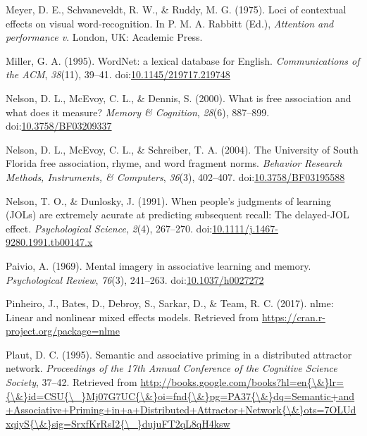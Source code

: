 \documentclass[english,,man]{apa6}
\begin{document}
\hypertarget{ref-Meyer1975}{}
Meyer, D. E., Schvaneveldt, R. W., \& Ruddy, M. G. (1975). Loci of
contextual effects on visual word-recognition. In P. M. A. Rabbitt
(Ed.), \emph{Attention and performance v}. London, UK: Academic Press.

\hypertarget{ref-Miller1995}{}
Miller, G. A. (1995). WordNet: a lexical database for English.
\emph{Communications of the ACM}, \emph{38}(11), 39--41.
doi:\href{https://doi.org/10.1145/219717.219748}{10.1145/219717.219748}

\hypertarget{ref-Nelson2000}{}
Nelson, D. L., McEvoy, C. L., \& Dennis, S. (2000). What is free
association and what does it measure? \emph{Memory \& Cognition},
\emph{28}(6), 887--899.
doi:\href{https://doi.org/10.3758/BF03209337}{10.3758/BF03209337}

\hypertarget{ref-Nelson2004}{}
Nelson, D. L., McEvoy, C. L., \& Schreiber, T. A. (2004). The University
of South Florida free association, rhyme, and word fragment norms.
\emph{Behavior Research Methods, Instruments, \& Computers},
\emph{36}(3), 402--407.
doi:\href{https://doi.org/10.3758/BF03195588}{10.3758/BF03195588}

\hypertarget{ref-Nelson1991}{}
Nelson, T. O., \& Dunlosky, J. (1991). When people's judgments of
learning (JOLs) are extremely acurate at predicting subsequent recall:
The delayed-JOL effect. \emph{Psychological Science}, \emph{2}(4),
267--270.
doi:\href{https://doi.org/10.1111/j.1467-9280.1991.tb00147.x}{10.1111/j.1467-9280.1991.tb00147.x}

\hypertarget{ref-Paivio1969}{}
Paivio, A. (1969). Mental imagery in associative learning and memory.
\emph{Psychological Review}, \emph{76}(3), 241--263.
doi:\href{https://doi.org/10.1037/h0027272}{10.1037/h0027272}

\hypertarget{ref-Pinheiro2017}{}
Pinheiro, J., Bates, D., Debroy, S., Sarkar, D., \& Team, R. C. (2017).
nlme: Linear and nonlinear mixed effects models. Retrieved from
\url{https://cran.r-project.org/package=nlme}

\hypertarget{ref-Plaut1995}{}
Plaut, D. C. (1995). Semantic and associative priming in a distributed
attractor network. \emph{Proceedings of the 17th Annual Conference of
the Cognitive Science Society}, 37--42. Retrieved from
\href{http://books.google.com/books?hl=en\%7B/\&\%7Dlr=\%7B/\&\%7Did=CSU\%7B/_\%7DMj07G7UC\%7B/\&\%7Doi=fnd\%7B/\&\%7Dpg=PA37\%7B/\&\%7Ddq=Semantic+and+Associative+Priming+in+a+Distributed+Attractor+Network\%7B/\&\%7Dots=7OLUdxqiyS\%7B/\&\%7Dsig=SrxfKrRsI2\%7B/_\%7DdujuFT2qL8qH4ksw}{http://books.google.com/books?hl=en\{\textbackslash{}\&\}lr=\{\textbackslash{}\&\}id=CSU\{\textbackslash{}\_\}Mj07G7UC\{\textbackslash{}\&\}oi=fnd\{\textbackslash{}\&\}pg=PA37\{\textbackslash{}\&\}dq=Semantic+and+Associative+Priming+in+a+Distributed+Attractor+Network\{\textbackslash{}\&\}ots=7OLUdxqiyS\{\textbackslash{}\&\}sig=SrxfKrRsI2\{\textbackslash{}\_\}dujuFT2qL8qH4ksw}
\end{document}
